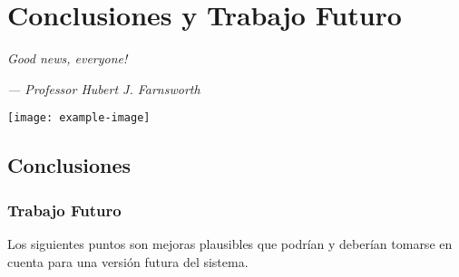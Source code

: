 \chapter{Conclusiones y Trabajo Futuro}
\epigraph{\textit{Good news, everyone!    
	}}{\textit{—  Professor Hubert J. Farnsworth}}
	\vspace*{8cm}
	\begin{center}
		\centering
		\texttt{[image: example-image]}
	\end{center}
	\thispagestyle{empty}
	\newpage
\vspace*{2cm}

\section{Conclusiones}
  \blindtext[1]
 
\begin{comment}
\section{Trabajo Terminal II}
		\begin{itemize}
			\item
		\end{itemize}
\end{comment}
 

\subsection{Trabajo Futuro}
Los siguientes puntos son mejoras plausibles que podrían y deberían tomarse en cuenta para una versión futura del sistema.

\blindtext[1]